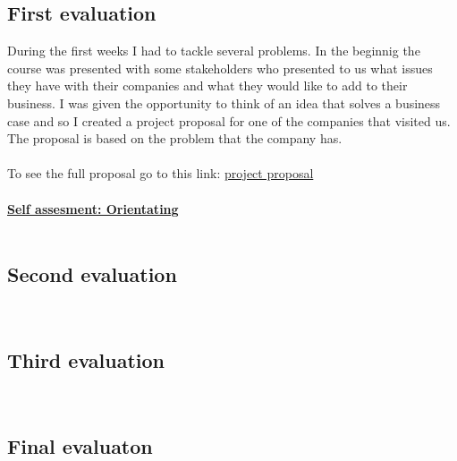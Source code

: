 \documentclass{article}
\begin{document}
\subsection{First evaluation}
During the first weeks I had to tackle several problems. In the beginnig the course was presented with some stakeholders 
who presented to us what issues they have with their companies and what they would like to add to their business. I was given 
the opportunity to think of an idea that solves a business case and so I created a project proposal for one of the companies that visited us. 
The proposal is based on the problem that the company has.\\\\
To see the full proposal go to this link: \href{https://github.com/BurovDanil/MinorAI/blob/main/Documents/Project%20Proposal/Proposal.md}{project proposal}\\\\
  \underline{\textbf{Self assesment: Orientating}}\\\\
\subsection{Second evaluation}\\
\subsection{Third evaluation}\\
\subsection{Final evaluaton}\\

\end{document}
